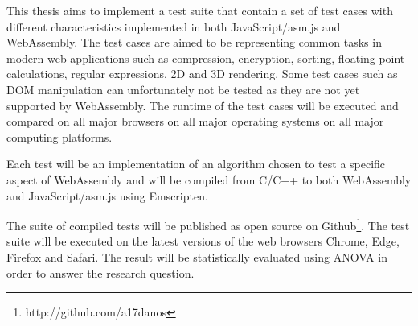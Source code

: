 
This thesis aims to implement a test suite that contain a set of test cases with different characteristics implemented in both JavaScript/asm.js and WebAssembly. The test cases are aimed to be representing common tasks \parencite{WohlinRunesonHostOhlssonRegnellWesslen2012} in modern web applications such as compression, encryption, sorting, floating point calculations, regular expressions, 2D and 3D rendering. Some test cases such as DOM manipulation can unfortunately not be tested as they are not yet supported by WebAssembly. The runtime of the test cases will be executed and compared on all major browsers on all major operating systems on all major computing platforms.

Each test will be an implementation of an algorithm chosen to test a specific aspect of WebAssembly and will be compiled from C/C++ to both WebAssembly and JavaScript/asm.js using Emscripten.


\begin{comment}
    

\hl{variabler och faktorer samt for och nackdelar med respektive metod, anvand wohlin som referens}

\begin{table}[h!]
\centering
\begin{tabular}{@{}llll@{}} 
\hline
 Algorithm & JavaScript & WebAssembly \\ [0.5ex] 
 \hline
 One & 123 & 123 \\ 
 Two & 456 & 456 \\
 ... & ... & ... \\
 Many & N & N \\ [1ex] 
 \hline
\end{tabular}
\caption{Test suite logical layout using mock data}
\label{table:suite}
\end{table}
\end{comment}

The suite of compiled tests will be published as open source on Github\footnote{http://github.com/a17danos}. The test suite will be executed on the latest versions of the web browsers Chrome, Edge, Firefox and Safari. The result will be statistically evaluated using ANOVA in order to answer the research question.

